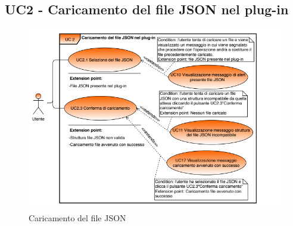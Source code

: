 
	\label{par:UC2}
	\subsection{UC2 - Caricamento del file JSON nel plug-in}
	
	\begin{figure}[H]
		\centering
		\includegraphics[scale=0.70]{../Analisi_dei_requisiti/img/Diagrammi_UML/UC2_Caricamento_file_JSON_nel_plug-in.png}
		\caption{Caricamento del file JSON}
	\end{figure}	
		
